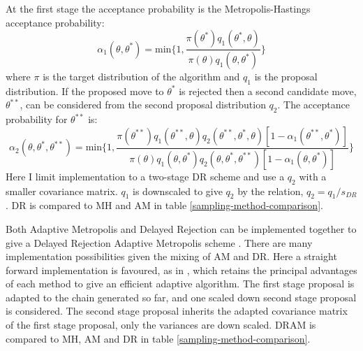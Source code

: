 At the first stage the acceptance probability is the Metropolis-Hastings acceptance probability:
\begin{equation}
	\alpha_1(\theta,\theta^*) = \text{min}\bigg\{1,\frac{\pi(\theta^*)q_1(\theta^*,\theta)}{\pi(\theta)q_1(\theta,\theta^*)} \bigg\}
\end{equation}
where $\pi$ is the target distribution of the algorithm and $q_1$ is the proposal distribution. If the proposed move to $\theta^*$ is rejected then a second candidate move, $\theta^{**}$, can be considered from the second proposal distribution $q_2$. The acceptance probability for $\theta^{**}$ is:
\begin{equation}
	\alpha_2(\theta,\theta^*,\theta^{**}) = \text{min}\bigg\{1,\frac{\pi(\theta^{**})q_1(\theta^{**},\theta)q_2(\theta^{**},\theta^*,\theta)[1-\alpha_1(\theta^{**},\theta^*)]}{\pi(\theta)q_1(\theta,\theta^*)q_2(\theta,\theta^*,\theta^{**})[1-\alpha_1(\theta,\theta^*)]} \bigg\}
\end{equation}
Here I limit implementation to a two-stage DR scheme and use a $q_2$ with a smaller covariance matrix. $q_1$ is downscaled to give $q_2$ by the relation, $q_2 = q_1/s_{DR}$. DR is compared to MH and AM in table \ref{sampling-method-comparison}.\par

Both Adaptive Metropolis and Delayed Rejection can be implemented together to give a Delayed Rejection Adaptive Metropolis scheme \citep{Haario2006}. There are many implementation possibilities given the mixing of AM and DR. Here a straight forward implementation is favoured, as in \citet{Laine2008}, which retains the principal advantages of each method to give an efficient adaptive algorithm.    The first stage proposal is adapted to the chain generated so far, and one scaled down second stage proposal is considered. The second stage proposal inherits the adapted covariance matrix of the first stage proposal, only the variances are down scaled. DRAM is compared to MH, AM and DR in table \ref{sampling-method-comparison}.\par

